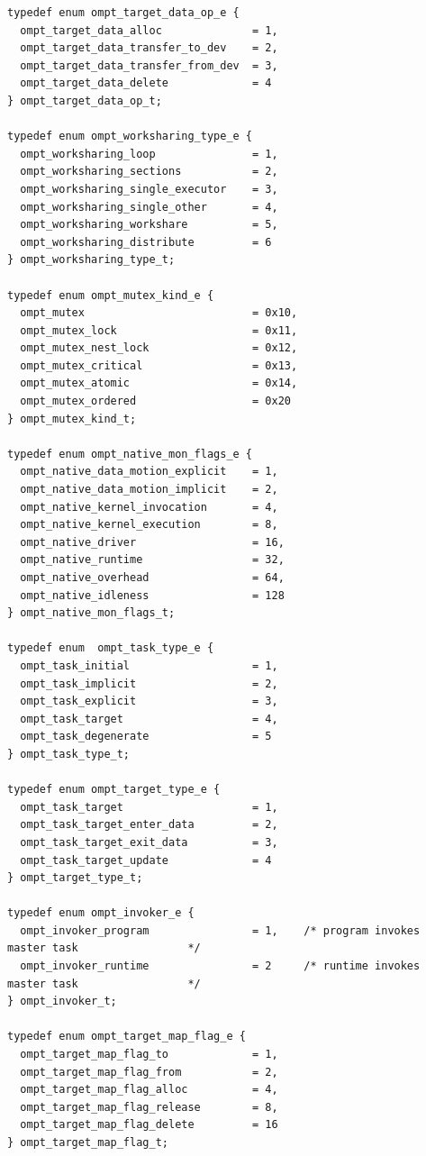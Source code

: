 \documentclass{article}
\begin{document}
\begin{lstlisting}
typedef enum ompt_target_data_op_e {
  ompt_target_data_alloc              = 1,
  ompt_target_data_transfer_to_dev    = 2,
  ompt_target_data_transfer_from_dev  = 3,
  ompt_target_data_delete             = 4
} ompt_target_data_op_t;

typedef enum ompt_worksharing_type_e {
  ompt_worksharing_loop               = 1, 
  ompt_worksharing_sections           = 2,
  ompt_worksharing_single_executor    = 3,
  ompt_worksharing_single_other       = 4,
  ompt_worksharing_workshare          = 5,
  ompt_worksharing_distribute         = 6
} ompt_worksharing_type_t;

typedef enum ompt_mutex_kind_e {
  ompt_mutex                          = 0x10,
  ompt_mutex_lock                     = 0x11,
  ompt_mutex_nest_lock                = 0x12,
  ompt_mutex_critical                 = 0x13,
  ompt_mutex_atomic                   = 0x14,
  ompt_mutex_ordered                  = 0x20
} ompt_mutex_kind_t;

typedef enum ompt_native_mon_flags_e {
  ompt_native_data_motion_explicit    = 1,
  ompt_native_data_motion_implicit    = 2,
  ompt_native_kernel_invocation       = 4,
  ompt_native_kernel_execution        = 8,
  ompt_native_driver                  = 16,
  ompt_native_runtime                 = 32,
  ompt_native_overhead                = 64,
  ompt_native_idleness                = 128
} ompt_native_mon_flags_t;

typedef enum  ompt_task_type_e {
  ompt_task_initial                   = 1,
  ompt_task_implicit                  = 2,
  ompt_task_explicit                  = 3,
  ompt_task_target                    = 4,
  ompt_task_degenerate                = 5
} ompt_task_type_t;

typedef enum ompt_target_type_e {
  ompt_task_target                    = 1,
  ompt_task_target_enter_data         = 2,
  ompt_task_target_exit_data          = 3,
  ompt_task_target_update             = 4
} ompt_target_type_t;

typedef enum ompt_invoker_e {
  ompt_invoker_program                = 1,    /* program invokes master task                 */
  ompt_invoker_runtime                = 2     /* runtime invokes master task                 */
} ompt_invoker_t;

typedef enum ompt_target_map_flag_e {
  ompt_target_map_flag_to             = 1,
  ompt_target_map_flag_from           = 2,
  ompt_target_map_flag_alloc          = 4,
  ompt_target_map_flag_release        = 8, 
  ompt_target_map_flag_delete         = 16
} ompt_target_map_flag_t;


\end{lstlisting}
\end{document}
